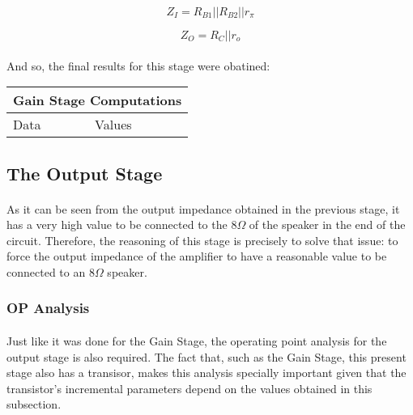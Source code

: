 \begin{equation}
    Z_I=R_{B1}||R_{B2}||r_\pi
\end{equation}

\begin{equation}
    Z_O=R_C||r_o
\end{equation}


\paragraph{}And so, the final results for this stage were obatined:

\begin{table}[H]
\centering
\begin{tabular}{|l|l|} 
\hline
\multicolumn{2}{|l|}{\textbf{Gain Stage Computations}}  \\ 
\hline
Data             & Values                               \\ 
\hline
%        
\end{tabular}
\end{table}







\subsection{The Output Stage}

\paragraph{}As it can be seen from the output impedance obtained in the previous stage, it has a very high value to be connected to the $8\Omega$ of the speaker in the end of the circuit. Therefore, the reasoning of this stage is precisely to solve that issue: to force the output impedance of the amplifier to have a reasonable value to be connected to an $8 \Omega$  speaker.


\subsubsection{OP Analysis}

\paragraph{}Just like it was done for the Gain Stage, the operating point analysis for the output stage is also required. The fact that, such as the Gain Stage, this present stage also has a transisor, makes this analysis specially important given that the transistor's incremental parameters depend on the values obtained in this subsection.

